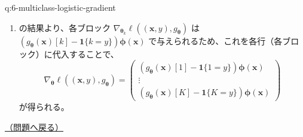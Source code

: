\documentclass[
  pandoc]{bxjsarticle}
\providecommand{\tightlist}{%
  \setlength{\itemsep}{0pt}\setlength{\parskip}{0pt}}
\begin{document}
\begin{answerbox}[phantomlabel=a:6-multiclass-logistic-gradient]{q:6-multiclass-logistic-gradient}
\begin{enumerate}
  \begin{enumerate}
  \def\labelenumii{(\arabic{enumii})}
  \setcounter{enumii}{1}
  \tightlist
  \item
    の結果より、各ブロック
    \(\nabla_{\boldsymbol{\theta}_k} \ell((\mathbf{x}, y), g_{\boldsymbol{\theta}})\)
    は
    \((g_{\boldsymbol{\theta}}(\mathbf{x})[k] - \mathbf{1}\{k = y\}) \boldsymbol{\phi}(\mathbf{x})\)
    で与えられるため、これを各行（各ブロック）に代入することで、 \[
    \nabla_{\boldsymbol{\theta}} \ell((\mathbf{x}, y), g_{\boldsymbol{\theta}}) = \begin{pmatrix} (g_{\boldsymbol{\theta}}(\mathbf{x})[1] - \mathbf{1}\{1 = y\}) \boldsymbol{\phi}(\mathbf{x}) \\ \vdots \\ (g_{\boldsymbol{\theta}}(\mathbf{x})[K] - \mathbf{1}\{K = y\}) \boldsymbol{\phi}(\mathbf{x}) \end{pmatrix}
    \] が得られる。
  \end{enumerate}
\end{enumerate}

\hfill 

\hyperref[q:6-multiclass-logistic-gradient]{（問題へ戻る）}

\end{answerbox}
\end{document}

